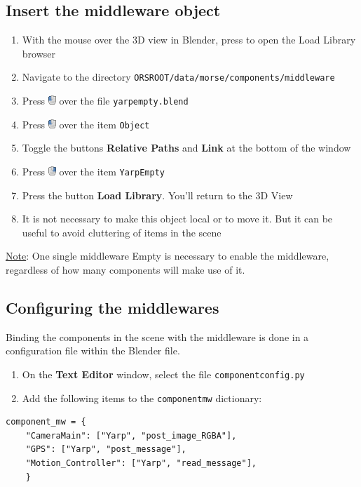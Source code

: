 \documentclass[twoside,a4paper,10pt]{report}
\newcommand{\key}[1]{\fcolorbox{Dark}{Light}{\textbf{#1}}}
\newcommand{\dokutitleleveltree}[1]{\subsection{#1}}
\newcommand{\dokubold}[1]{\textbf{#1}}
\newcommand{\dokumonospace}[1]{\texttt{#1}}
\newcommand{\dokuunderline}[1]{\underline{#1}}
\newcommand{\dokuitem}{\item}
\begin{document}
\dokutitleleveltree{Insert the middleware object}
\label{fc2213e90f6f9853c66c14f9f79c3379}%

\begin{enumerate}\dokuitem  With the mouse over the 3D view in Blender, press \key{Shift + F1} to open the Load Library browser
\dokuitem  Navigate to the directory \dokumonospace{{\textdollar}ORS{\textunderscore}ROOT/data/morse/components/middleware}
\dokuitem  Press \includegraphics[height=1em]{LMB.png} over the file \dokumonospace{yarp{\textunderscore}empty.blend}
\dokuitem  Press \includegraphics[height=1em]{LMB.png} over the item \dokumonospace{Object}
\dokuitem  Toggle the buttons \dokubold{Relative Paths} and \dokubold{Link} at the bottom of the window
\dokuitem  Press \includegraphics[height=1em]{RMB.png} over the item \dokumonospace{Yarp{\textunderscore}Empty}
\dokuitem  Press the button \dokubold{Load Library}. You'll return to the 3D View
\dokuitem  It is not necessary to make this object local or to move it. But it can be useful to avoid cluttering of items in the scene 
\end{enumerate}

\dokuunderline{Note}: One single middleware Empty is necessary to enable the middleware, regardless of how many components will make use of it.


\dokutitleleveltree{Configuring the middlewares}
\label{7c1b9786b6402b908e3042548cd3c1c6}%
Binding the components in the scene with the middleware is done in a configuration file within the Blender file.



\begin{enumerate}\dokuitem  On the \dokubold{Text Editor} window, select the file \dokumonospace{component{\textunderscore}config.py}
\dokuitem  Add the following items to the \dokumonospace{component{\textunderscore}mw} dictionary:
\end{enumerate}

\lstset{language=python}
\begin{lstlisting}
component_mw = {
    "CameraMain": ["Yarp", "post_image_RGBA"],
    "GPS": ["Yarp", "post_message"],
    "Motion_Controller": ["Yarp", "read_message"],
	}

\end{lstlisting}
\end{document}
